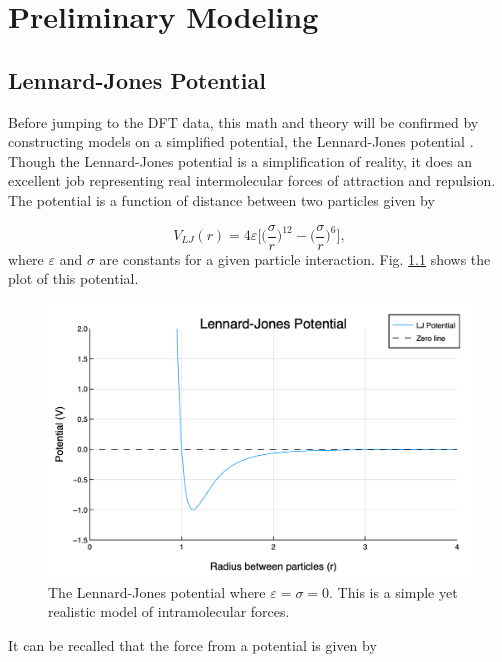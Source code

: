 \chapter{Preliminary Modeling}\label{Sect:modelPrep}

\section{Lennard-Jones Potential}\label{Sect:LJPotential}
Before jumping to the DFT data, this math and theory will be confirmed by constructing models on a simplified potential, the Lennard-Jones potential \cite{LJ-potential}. Though the Lennard-Jones potential is a simplification of reality, it does an excellent job representing real intermolecular forces of attraction and repulsion. The potential is a function of distance between two particles given by

\begin{equation} \label{eq:LJ}
V_{LJ}(r) = 4\varepsilon \bigg[\Big(\frac{\sigma}{r}\Big)^{12} - \Big(\frac{\sigma}{r}\Big)^6\bigg],
\end{equation}
where $\varepsilon$ and $\sigma$ are constants for a given particle interaction. Fig. \ref{fig:LJ} shows the plot of this potential.

\begin{figure}%
\centering
\includegraphics[scale = 0.6]{Figures/LJPotential}
\caption{The Lennard-Jones potential where $\varepsilon=\sigma=0$. This is a simple yet realistic model of intramolecular forces.
\label{fig:LJ}} 
\end{figure}

\par It can be recalled that the force from a potential is given by

